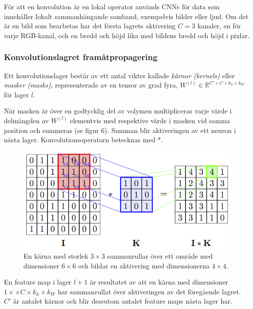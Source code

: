 \documentclass[a4paper,11pt,twoside]{article}
\begin{document}
För att en konvolution är en lokal operator används CNNs för data som innehåller lokalt sammanhängande samband, exempelvis bilder eller ljud. Om det är en bild som bearbetas har det första lagrets aktivering $C = 3$ kanaler, en för varje RGB-kanal, och en bredd och höjd lika med bildens bredd och höjd i pixlar. \cite{cs231n} \cite{convmath}

\subsubsection{Konvolutionslagret framåtpropagering}
Ett konvolutionslager består av ett antal vikter kallade \textit{kärnor (kernels)} eller \textit{masker (masks)}, representerade av en tensor av grad fyra, $W^{(l)} \in \mathbb{R}^{C' \times C  \times k_h \times k_W}$ för lager $l$. \cite{cs231n} \cite{convmath}

När masken är över en godtycklig del av volymen multipliceras varje värde i delmängden av $W^{(l)}$ elementvis med respektive värde i masken vid samma position och summeras (se figur 6). Summan blir aktiveringen av ett neuron i nästa lager. Konvolutionsoperatorn betecknas med $*$. \cite{cs231n} \cite{convmath}

\begin{figure}[h]\label{figkonv}
	\centering
  		\includegraphics[scale=2.1]{convolution.png}
  	\caption{En kärna med storlek $3 \times 3$ sammanrullar över ett område med dimensioner $6 \times 6$ och bildar en aktivering med dimensionerna $4 \times 4$. \cite{figkonv}}
\end{figure}

En feature map i lager $l+1$ är resultatet av att en kärna med dimensioner $1 \times \times C  \times k_h \times k_W$ har sammanrullat över aktiveringen av det föregående lagret. $C'$ är antalet kärnor och blir dessutom antalet feature maps nästa lager har. \cite{cs231n} \cite{convmath}
\end{document}
